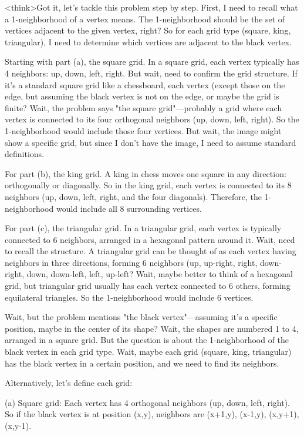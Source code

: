 <think>Got it, let's tackle this problem step by step. First, I need to recall what a 1-neighborhood of a vertex means. The 1-neighborhood should be the set of vertices adjacent to the given vertex, right? So for each grid type (square, king, triangular), I need to determine which vertices are adjacent to the black vertex.

Starting with part (a), the square grid. In a square grid, each vertex typically has 4 neighbors: up, down, left, right. But wait, need to confirm the grid structure. If it's a standard square grid like a chessboard, each vertex (except those on the edge, but assuming the black vertex is not on the edge, or maybe the grid is finite? Wait, the problem says "the square grid"—probably a grid where each vertex is connected to its four orthogonal neighbors (up, down, left, right). So the 1-neighborhood would include those four vertices. But wait, the image might show a specific grid, but since I don't have the image, I need to assume standard definitions.

For part (b), the king grid. A king in chess moves one square in any direction: orthogonally or diagonally. So in the king grid, each vertex is connected to its 8 neighbors (up, down, left, right, and the four diagonals). Therefore, the 1-neighborhood would include all 8 surrounding vertices.

For part (c), the triangular grid. In a triangular grid, each vertex is typically connected to 6 neighbors, arranged in a hexagonal pattern around it. Wait, need to recall the structure. A triangular grid can be thought of as each vertex having neighbors in three directions, forming 6 neighbors (up, up-right, right, down-right, down, down-left, left, up-left? Wait, maybe better to think of a hexagonal grid, but triangular grid usually has each vertex connected to 6 others, forming equilateral triangles. So the 1-neighborhood would include 6 vertices.

Wait, but the problem mentions "the black vertex"—assuming it's a specific position, maybe in the center of its shape? Wait, the shapes are numbered 1 to 4, arranged in a square grid. But the question is about the 1-neighborhood of the black vertex in each grid type. Wait, maybe each grid (square, king, triangular) has the black vertex in a certain position, and we need to find its neighbors.

Alternatively, let's define each grid:

(a) Square grid: Each vertex has 4 orthogonal neighbors (up, down, left, right). So if the black vertex is at position (x,y), neighbors are (x+1,y), (x-1,y), (x,y+1), (x,y-1).

